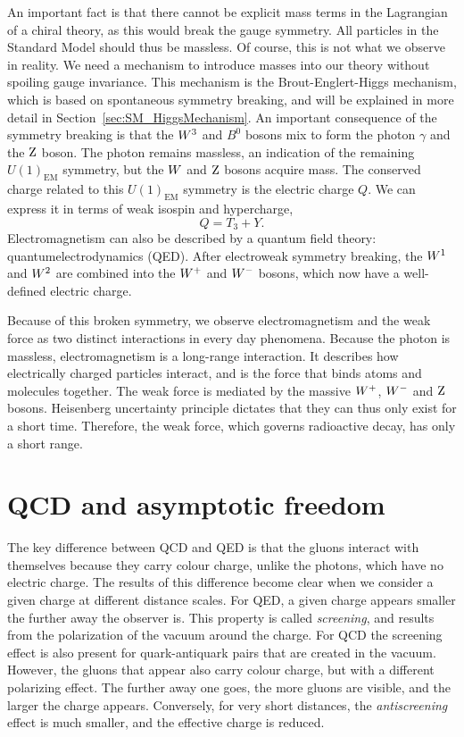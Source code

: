 An important fact is that there cannot be explicit mass terms in the Lagrangian of a chiral theory,
as this would break the gauge symmetry. All particles in the Standard Model should thus be massless.
Of course, this is not what we observe in reality. 
We need a mechanism to introduce masses into our theory without spoiling gauge
invariance. This mechanism is the Brout-Englert-Higgs mechanism, which is based on spontaneous
symmetry breaking, and will be explained in more detail in Section~\ref{sec:SM_HiggsMechanism}.
An important consequence of the symmetry breaking is that the $W^3$ and $B^0$ bosons mix to
form the photon $\gamma$ and the $\mathrm{Z}$ boson. 
The photon remains massless, an indication of the remaining $U(1)_{\text{EM}}$ symmetry,
but the $W$ and $\mathrm{Z}$ bosons acquire mass. 
The conserved charge related to this $U(1)_{\text{EM}}$ symmetry is the electric charge $Q$. We can
express it in terms of weak isospin and hypercharge,
\begin{equation}
  Q = T_3 + Y .
\end{equation}
Electromagnetism can also be described by a quantum field theory: quantumelectrodynamics (QED).
After electroweak symmetry breaking, the $W^1$ and $W^2$ are combined into the $W^+$ and $W^-$
bosons, which now have a well-defined electric charge. 

Because of this broken symmetry, we observe electromagnetism and the weak force as two distinct
interactions in every day phenomena. 
Because the photon is massless, electromagnetism is a long-range interaction. It describes how
electrically charged particles interact, and is the force that binds atoms and molecules together.
The weak force is mediated by the massive $W^+$, $W^-$ and $\mathrm{Z}$ bosons.
Heisenberg uncertainty principle dictates that they can thus only exist for a short time. Therefore,
the weak force, which governs radioactive decay, has only a short range.



\section{QCD and asymptotic freedom \label{sec:SM_QCD}}

The key difference between QCD and QED is that the gluons interact with themselves because they
carry colour charge, unlike the photons, which have no electric charge. The results of this
difference become clear when we consider a given charge at different distance scales. For QED, a
given charge appears smaller the further away the observer is. This property is called
\textit{screening}, and results from the polarization of the vacuum around the charge. 
For QCD the screening effect is also present for quark-antiquark pairs that are created in the
vacuum. However, the gluons that appear also carry colour charge, but with a different polarizing
effect. The further away one goes, the more gluons are visible, and the larger the charge appears.
Conversely, for very short distances, the \textit{antiscreening} effect is much smaller, and the
effective charge is reduced. 

